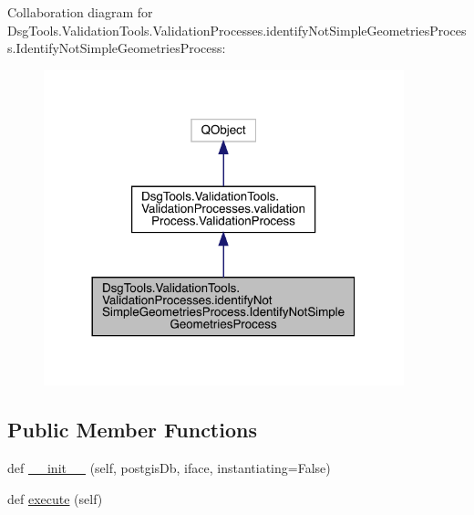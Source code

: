 Collaboration diagram for Dsg\+Tools.\+Validation\+Tools.\+Validation\+Processes.\+identify\+Not\+Simple\+Geometries\+Process.\+Identify\+Not\+Simple\+Geometries\+Process\+:
\nopagebreak
\begin{figure}[H]
\begin{center}
\leavevmode
\includegraphics[width=296pt]{class_dsg_tools_1_1_validation_tools_1_1_validation_processes_1_1identify_not_simple_geometries_2dded51563f4b4b7b43e9e33f16c5610}
\end{center}
\end{figure}
\subsection*{Public Member Functions}
\begin{DoxyCompactItemize}
\item 
def \mbox{\hyperlink{class_dsg_tools_1_1_validation_tools_1_1_validation_processes_1_1identify_not_simple_geometries_cc91ad4d87ecabb6a33270acc62526dc_ad8c6128e8f64a70bcffcf65244623dc1}{\+\_\+\+\_\+init\+\_\+\+\_\+}} (self, postgis\+Db, iface, instantiating=False)
\item 
def \mbox{\hyperlink{class_dsg_tools_1_1_validation_tools_1_1_validation_processes_1_1identify_not_simple_geometries_cc91ad4d87ecabb6a33270acc62526dc_a95e5f63e116d35b1b34789a1b58d4d5a}{execute}} (self)
\end{DoxyCompactItemize}
